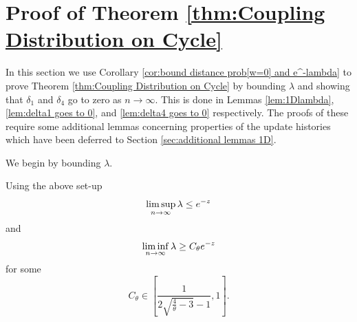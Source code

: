 	\section{Proof of Theorem \ref{thm:Coupling Distribution on Cycle}}
	\label{sec:proof thm coupling cycle}
	In this section we use Corollary \ref{cor:bound distance prob[w=0] and e^-lambda} to prove Theorem \ref{thm:Coupling Distribution on Cycle} by bounding $\lambda$ and showing that $\delta_1$ and $\delta_4$ go to zero as $n \rightarrow \infty$. This is done in Lemmas \ref{lem:1Dlambda}, \ref{lem:delta1 goes to 0}, and \ref{lem:delta4 goes to 0} respectively. The proofs of these require some additional lemmas concerning properties of the update histories which have been deferred to Section \ref{sec:additional lemmas 1D}.

	We begin by bounding $\lambda$.
	\begin{lemma}
	\label{lem:1Dlambda}
		Using the above set-up
		\begin{equation}
			\limsup_{n \rightarrow \infty} \lambda \leq e^{-z}
		\end{equation}
		and
		\begin{equation}
			\liminf_{n \rightarrow \infty} \lambda \geq C_\theta e^{-z}
		\end{equation}
		for some
		\begin{equation}
			C_\theta \in \left[\frac{1}{2\sqrt{\frac{4}{\theta} - 3} - 1}, 1\right].
		\end{equation}
	\end{lemma}
